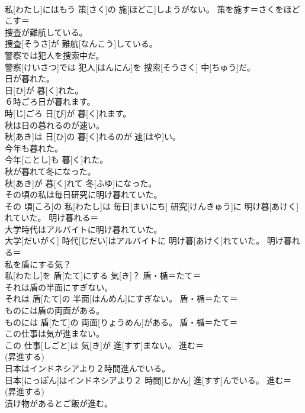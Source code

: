 \documentclass[8pt]{extreport}
\begin{document}
\begin{CJK}{UTF8}{min}
{\\	私[わたし]にはもう 策[さく]の 施[ほどこ]しようがない。	策を施す＝さくをほどこす＝ 
\\	捜査が難航している。	
\\	捜査[そうさ]が 難航[なんこう]している。	
\\	警察では犯人を捜索中だ。	
\\	警察[けいさつ]では 犯人[はんにん]を 捜索[そうさく] 中[ちゅう]だ。	
\\	日が暮れた。	
\\	日[ひ]が 暮[く]れた。	
\\	６時ごろ日が暮れます。	
\\	時[じ]ごろ 日[び]が 暮[く]れます。	
\\	秋は日の暮れるのが速い。	
\\	秋[あき]は 日[ひ]の 暮[く]れるのが 速[はや]い。	
\\	今年も暮れた。	
\\	今年[ことし]も 暮[く]れた。	
\\	秋が暮れて冬になった。	
\\	秋[あき]が 暮[く]れて 冬[ふゆ]になった。	
\\	その頃の私は毎日研究に明け暮れていた。	
\\	その 頃[ころ]の 私[わたし]は 毎日[まいにち] 研究[けんきゅう]に 明け暮[あけく]れていた。	明け暮れる＝ 
\\	大学時代はアルバイトに明け暮れていた。	
\\	大学[だいがく] 時代[じだい]はアルバイトに 明け暮[あけく]れていた。	明け暮れる＝ 
\\	私を盾にする気？	
\\	私[わたし]を 盾[たて]にする 気[き]？	盾・楯＝たて＝ 
\\	それは盾の半面にすぎない。	
\\	それは 盾[たて]の 半面[はんめん]にすぎない。	盾・楯＝たて＝ 
\\	ものには盾の両面がある。	
\\	ものには 盾[たて]の 両面[りょうめん]がある。	盾・楯＝たて＝ 
\\	この仕事は気が進まない。	
\\	この 仕事[しごと]は 気[き]が 進[すす]まない。	進む＝ 
\\	(昇進する) 
\\	日本はインドネシアより２時間進んでいる。	
\\	日本[にっぽん]はインドネシアより２ 時間[じかん] 進[すす]んでいる。	進む＝ 
\\	(昇進する) 
\\	漬け物があるとご飯が進む。	
}
\end{CJK}
\end{document}
